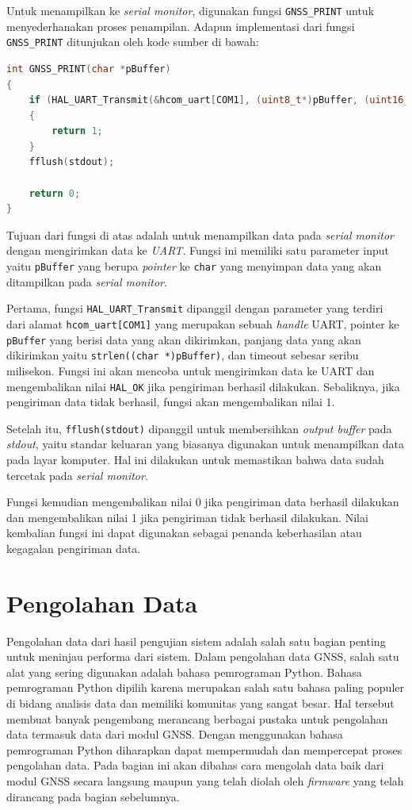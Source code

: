 Untuk menampilkan ke \textit{serial monitor}, digunakan fungsi \texttt{GNSS\_PRINT} untuk menyederhanakan proses penampilan. Adapun implementasi dari fungsi \texttt{GNSS\_PRINT} ditunjukan oleh kode sumber di bawah:

\begin{lstlisting}[language=c]
int GNSS_PRINT(char *pBuffer)
{
	if (HAL_UART_Transmit(&hcom_uart[COM1], (uint8_t*)pBuffer, (uint16_t)strlen((char *)pBuffer), 1000) != HAL_OK)
	{
		return 1;
	}
	fflush(stdout);
	
	return 0;
}
\end{lstlisting}

Tujuan dari fungsi di atas adalah untuk menampilkan data pada \textit{serial monitor} dengan mengirimkan data ke \textit{UART}. Fungsi ini memiliki satu parameter input yaitu \texttt{pBuffer} yang berupa \textit{pointer} ke \texttt{char} yang menyimpan data yang akan ditampilkan pada \textit{serial monitor}.

Pertama, fungsi \texttt{HAL\_UART\_Transmit} dipanggil dengan parameter yang terdiri dari alamat \texttt{hcom\_uart[COM1]} yang merupakan sebuah \textit{handle} UART, pointer ke \texttt{pBuffer} yang berisi data yang akan dikirimkan, panjang data yang akan dikirimkan yaitu \texttt{strlen((char *)pBuffer)}, dan timeout sebesar seribu milisekon. Fungsi ini akan mencoba untuk mengirimkan data ke UART dan mengembalikan nilai \texttt{HAL\_OK} jika pengiriman berhasil dilakukan. Sebaliknya, jika pengiriman data tidak berhasil, fungsi akan mengembalikan nilai 1.

Setelah itu, \texttt{fflush(stdout)} dipanggil untuk membersihkan \textit{output buffer} pada \textit{stdout}, yaitu standar keluaran yang biasanya digunakan untuk menampilkan data pada layar komputer. Hal ini dilakukan untuk memastikan bahwa data sudah tercetak pada \textit{serial monitor}.

Fungsi kemudian mengembalikan nilai 0 jika pengiriman data berhasil dilakukan dan mengembalikan nilai 1 jika pengiriman tidak berhasil dilakukan. Nilai kembalian fungsi ini dapat digunakan sebagai penanda keberhasilan atau kegagalan pengiriman data.

\section{Pengolahan Data}
Pengolahan data dari hasil pengujian sistem adalah salah satu bagian penting untuk meninjau performa dari sistem. Dalam pengolahan data GNSS, salah satu alat yang sering digunakan adalah bahasa pemrograman Python. Bahasa pemrograman Python dipilih karena merupakan salah satu bahasa paling populer di bidang analisis data dan memiliki komunitas yang sangat besar. Hal tersebut membuat banyak pengembang merancang berbagai pustaka untuk pengolahan data termasuk data dari modul GNSS. Dengan menggunakan bahasa pemrograman Python diharapkan dapat mempermudah dan mempercepat proses pengolahan data. Pada bagian ini akan dibahas cara mengolah data baik dari modul GNSS secara langsung maupun yang telah diolah oleh \textit{firmware} yang telah dirancang pada bagian sebelumnya.

